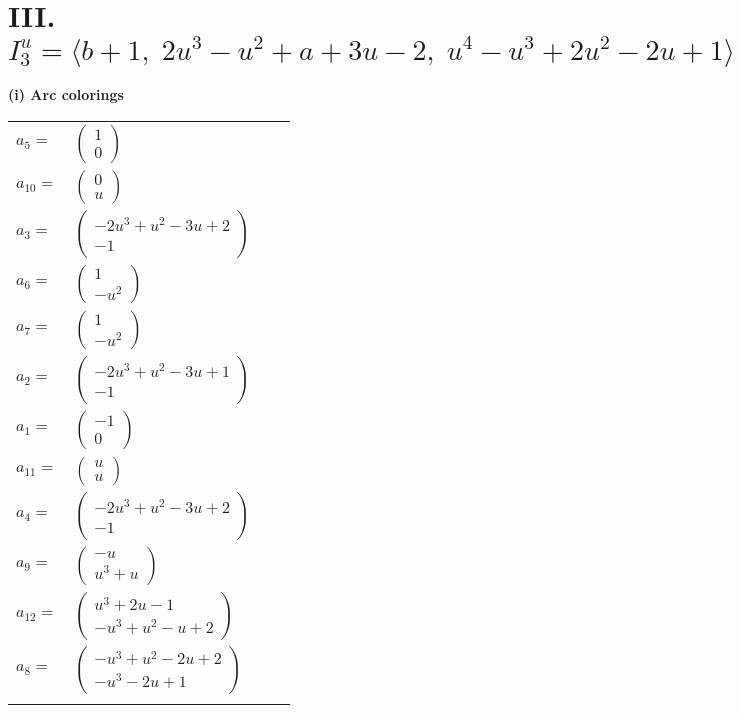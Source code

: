 \documentclass[1p]{elsarticle_modified}
\theoremstyle{definition}
\begin{document}
\centering \section*{III. $I^u_{3}= \langle b+1,\;2 u^3- u^2+a+3 u-2,\;u^4- u^3+2 u^2-2 u+1 \rangle$}
\flushleft \textbf{(i) Arc colorings}\\
\begin{tabular}{m{7pt} m{180pt} m{7pt} m{180pt} }
\flushright $a_{5}=$&$\begin{pmatrix}1\\0\end{pmatrix}$ \\
\flushright $a_{10}=$&$\begin{pmatrix}0\\u\end{pmatrix}$ \\
\flushright $a_{3}=$&$\begin{pmatrix}-2 u^3+u^2-3 u+2\\-1\end{pmatrix}$ \\
\flushright $a_{6}=$&$\begin{pmatrix}1\\- u^2\end{pmatrix}$ \\
\flushright $a_{7}=$&$\begin{pmatrix}1\\- u^2\end{pmatrix}$ \\
\flushright $a_{2}=$&$\begin{pmatrix}-2 u^3+u^2-3 u+1\\-1\end{pmatrix}$ \\
\flushright $a_{1}=$&$\begin{pmatrix}-1\\0\end{pmatrix}$ \\
\flushright $a_{11}=$&$\begin{pmatrix}u\\u\end{pmatrix}$ \\
\flushright $a_{4}=$&$\begin{pmatrix}-2 u^3+u^2-3 u+2\\-1\end{pmatrix}$ \\
\flushright $a_{9}=$&$\begin{pmatrix}- u\\u^3+u\end{pmatrix}$ \\
\flushright $a_{12}=$&$\begin{pmatrix}u^3+2 u-1\\- u^3+u^2- u+2\end{pmatrix}$ \\
\flushright $a_{8}=$&$\begin{pmatrix}- u^3+u^2-2 u+2\\- u^3-2 u+1\end{pmatrix}$\\&\end{tabular}
\end{document}
